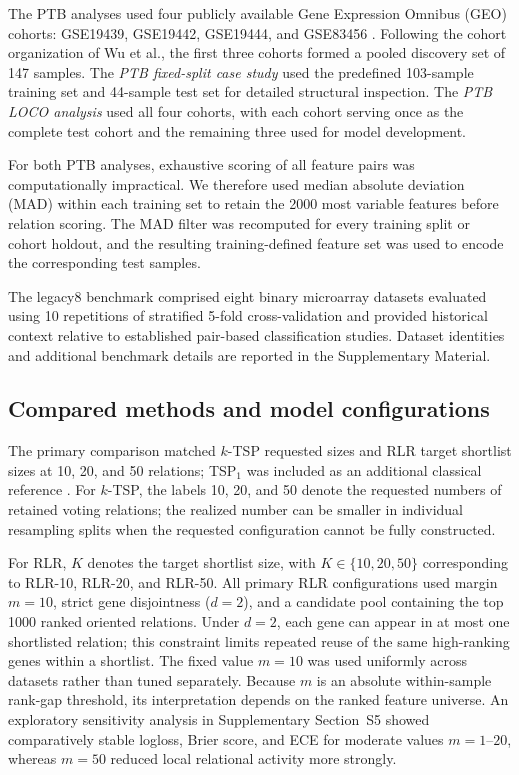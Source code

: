 \documentclass[preprint,12pt,a4paper]{elsarticle}
\begin{document}
The PTB analyses used four publicly available Gene Expression Omnibus (GEO) cohorts: GSE19439, GSE19442, GSE19444, and GSE83456 \cite{Wu2025}. Following the cohort organization of Wu et al., the first three cohorts formed a pooled discovery set of 147 samples. The \emph{PTB fixed-split case study} used the predefined 103-sample training set and 44-sample test set for detailed structural inspection. The \emph{PTB LOCO analysis} used all four cohorts, with each cohort serving once as the complete test cohort and the remaining three used for model development.

For both PTB analyses, exhaustive scoring of all feature pairs was computationally impractical. We therefore used median absolute deviation (MAD) within each training set to retain the 2000 most variable features before relation scoring. The MAD filter was recomputed for every training split or cohort holdout, and the resulting training-defined feature set was used to encode the corresponding test samples.

The legacy8 benchmark comprised eight binary microarray datasets evaluated using 10 repetitions of stratified 5-fold cross-validation and provided historical context relative to established pair-based classification studies. Dataset identities and additional benchmark details are reported in the Supplementary Material.

\subsection{Compared methods and model configurations}

The primary comparison matched $k$-TSP requested sizes and RLR target shortlist sizes at 10, 20, and 50 relations; TSP$_1$ was included as an additional classical reference \cite{Geman2004,Tan2005,Afsari2015}. For $k$-TSP, the labels 10, 20, and 50 denote the requested numbers of retained voting relations; the realized number can be smaller in individual resampling splits when the requested configuration cannot be fully constructed.

For RLR, $K$ denotes the target shortlist size, with $K\in\{10,20,50\}$ corresponding to RLR-10, RLR-20, and RLR-50. All primary RLR configurations used margin $m=10$, strict gene disjointness ($d=2$), and a candidate pool containing the top 1000 ranked oriented relations. Under $d=2$, each gene can appear in at most one shortlisted relation; this constraint limits repeated reuse of the same high-ranking genes within a shortlist. The fixed value $m=10$ was used uniformly across datasets rather than tuned separately. Because $m$ is an absolute within-sample rank-gap threshold, its interpretation depends on the ranked feature universe. An exploratory sensitivity analysis in Supplementary Section~S5 showed comparatively stable logloss, Brier score, and ECE for moderate values $m=1$--$20$, whereas $m=50$ reduced local relational activity more strongly.
\end{document}
